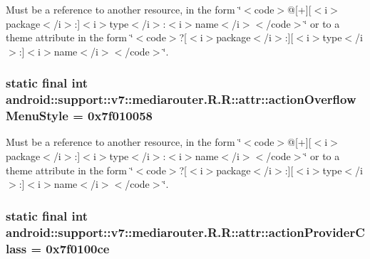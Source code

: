 Must be a reference to another resource, in the form \char`\"{}$<$code$>$@\mbox{[}+\mbox{]}\mbox{[}$<$i$>$package$<$/i$>$:\mbox{]}$<$i$>$type$<$/i$>$:$<$i$>$name$<$/i$>$$<$/code$>$\char`\"{} or to a theme attribute in the form \char`\"{}$<$code$>$?\mbox{[}$<$i$>$package$<$/i$>$:\mbox{]}\mbox{[}$<$i$>$type$<$/i$>$:\mbox{]}$<$i$>$name$<$/i$>$$<$/code$>$\char`\"{}. \hypertarget{classandroid_1_1support_1_1v7_1_1mediarouter_1_1_r_1_1attr_c54beba6327c4b9b450c82108a507bc0}{
\subsubsection[{actionOverflowMenuStyle}]{\setlength{\rightskip}{0pt plus 5cm}static final int android::support::v7::mediarouter.R.R::attr::actionOverflowMenuStyle = 0x7f010058}}
\label{classandroid_1_1support_1_1v7_1_1mediarouter_1_1_r_1_1attr_c54beba6327c4b9b450c82108a507bc0}


Must be a reference to another resource, in the form \char`\"{}$<$code$>$@\mbox{[}+\mbox{]}\mbox{[}$<$i$>$package$<$/i$>$:\mbox{]}$<$i$>$type$<$/i$>$:$<$i$>$name$<$/i$>$$<$/code$>$\char`\"{} or to a theme attribute in the form \char`\"{}$<$code$>$?\mbox{[}$<$i$>$package$<$/i$>$:\mbox{]}\mbox{[}$<$i$>$type$<$/i$>$:\mbox{]}$<$i$>$name$<$/i$>$$<$/code$>$\char`\"{}. \hypertarget{classandroid_1_1support_1_1v7_1_1mediarouter_1_1_r_1_1attr_6a48aee675f845ed5012dddec314463f}{
\subsubsection[{actionProviderClass}]{\setlength{\rightskip}{0pt plus 5cm}static final int android::support::v7::mediarouter.R.R::attr::actionProviderClass = 0x7f0100ce}}
\label{classandroid_1_1support_1_1v7_1_1mediarouter_1_1_r_1_1attr_6a48aee675f845ed5012dddec314463f}



